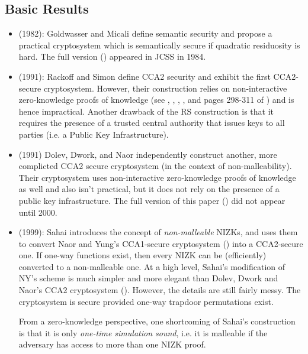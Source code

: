 \subsection{Basic Results}
\begin{itemize}
\item \cite{goldwasser:probenc1} (1982): Goldwasser and Micali define
semantic security and propose a practical cryptosystem which is semantically
secure if quadratic residuosity is hard. The full version
(\cite{goldwasser:probenc2}) appeared in JCSS in 1984.

\item \cite{rackoff:cca2} (1991): Rackoff and Simon define CCA2 security and
exhibit the first CCA2-secure cryptosystem. However, their construction relies on
non-interactive zero-knowledge proofs of knowledge (see
\cite{blum:noninterzerok}, \cite{bellare:noninterzk}, \cite{naor:cca1},
\cite{feige:multnizk}, and pages 298-311 of \cite{goldreich:foundations1}) and is hence impractical.
Another drawback of the RS construction is that it requires the presence
of a trusted central authority that issues keys to all parties (i.e. a
Public Key Infrastructure).

\item \cite{dolev:nonmalleable1} (1991) Dolev, Dwork, and Naor independently construct
another, more complicted CCA2 secure cryptosystem (in the context of
non-malleability). Their cryptosystem uses non-interactive zero-knowledge
proofs of knowledge as well and also isn't practical, but it does not rely on
the presence of a public key infrastructure. The full version of this
paper (\cite{dolev:nonmalleable2}) did not appear until 2000. 

\item \cite{sahai:nizkcca} (1999): Sahai introduces the concept of
\emph{non-malleable} NIZKs, and uses them to convert
Naor and Yung's CCA1-secure cryptosystem (\cite{naor:cca1}) into a CCA2-secure
one. If one-way functions exist, then every NIZK can be (efficiently) converted
to a non-malleable one. At a high level, Sahai's modification of NY's scheme is much simpler
and more elegant than Dolev, Dwork and Naor's CCA2 cryptosystem
(\cite{dolev:nonmalleable1}). However, the details are still fairly messy. The
cryptosystem is secure provided one-way trapdoor permutations exist.

From a zero-knowledge perspective, one shortcoming of Sahai's construction is
that it is only \emph{one-time simulation sound}, i.e. it is malleable if
the adversary has access to more than one NIZK proof.


\end{itemize}
